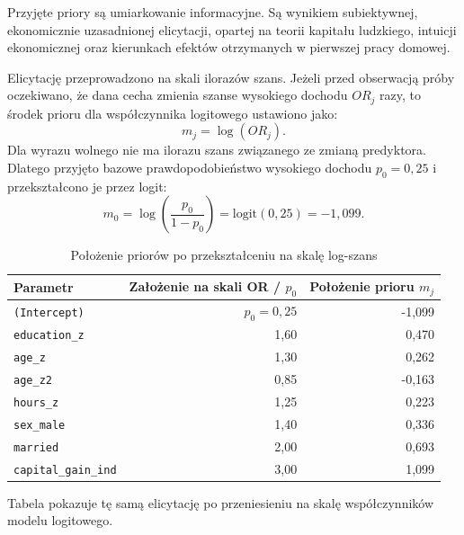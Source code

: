 \documentclass[12pt,a4paper]{article}
\begin{document}
Przyjęte priory są umiarkowanie informacyjne. Są wynikiem subiektywnej, ekonomicznie
uzasadnionej elicytacji, opartej na teorii kapitału ludzkiego, intuicji
ekonomicznej oraz kierunkach efektów otrzymanych w pierwszej pracy domowej.

Elicytację przeprowadzono na skali ilorazów szans. Jeżeli przed obserwacją
próby oczekiwano, że dana cecha zmienia szanse wysokiego dochodu \(OR_j\) razy,
to środek prioru dla współczynnika logitowego ustawiono jako:
\[
 m_j = \log(OR_j).
\]
Dla wyrazu wolnego nie ma ilorazu szans związanego ze zmianą predyktora. Dlatego
przyjęto bazowe prawdopodobieństwo wysokiego dochodu \(p_0=0{,}25\) i
przekształcono je przez logit:
\[
 m_0 = \log\left(\frac{p_0}{1-p_0}\right) = \mathrm{logit}(0{,}25)=-1{,}099.
\]

\begin{table}[H]
\centering
\caption{Położenie priorów po przekształceniu na skalę log-szans}
\small
\begin{tabular}{lrr}
\toprule
Parametr & Założenie na skali OR / \(p_0\) & Położenie prioru \(m_j\) \\
\midrule
\texttt{(Intercept)} & \(p_0=0{,}25\) & -1{,}099 \\
\texttt{education\_z} & 1{,}60 & 0{,}470 \\
\texttt{age\_z} & 1{,}30 & 0{,}262 \\
\texttt{age\_z2} & 0{,}85 & -0{,}163 \\
\texttt{hours\_z} & 1{,}25 & 0{,}223 \\
\texttt{sex\_male} & 1{,}40 & 0{,}336 \\
\texttt{married} & 2{,}00 & 0{,}693 \\
\texttt{capital\_gain\_ind} & 3{,}00 & 1{,}099 \\
\bottomrule
\end{tabular}
\end{table}

Tabela pokazuje tę samą elicytację po przeniesieniu na skalę współczynników
modelu logitowego.
\end{document}
